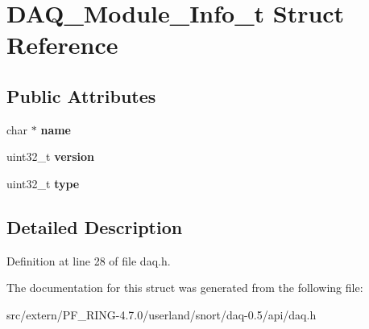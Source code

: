 \hypertarget{struct_d_a_q___module___info__t}{
\section{DAQ\_\-Module\_\-Info\_\-t Struct Reference}
\label{struct_d_a_q___module___info__t}
}
\subsection*{Public Attributes}
\begin{DoxyCompactItemize}
\item 
\hypertarget{struct_d_a_q___module___info__t_ad6b68b30f3673f8721b6b3a95b452eba}{
char $\ast$ {\bfseries name}}
\label{struct_d_a_q___module___info__t_ad6b68b30f3673f8721b6b3a95b452eba}

\item 
\hypertarget{struct_d_a_q___module___info__t_a2e31ed2b31402507de7e6ca8e21eac14}{
uint32\_\-t {\bfseries version}}
\label{struct_d_a_q___module___info__t_a2e31ed2b31402507de7e6ca8e21eac14}

\item 
\hypertarget{struct_d_a_q___module___info__t_a524554afb1a9babad0d50deae9026a45}{
uint32\_\-t {\bfseries type}}
\label{struct_d_a_q___module___info__t_a524554afb1a9babad0d50deae9026a45}

\end{DoxyCompactItemize}


\subsection{Detailed Description}


Definition at line 28 of file daq.h.



The documentation for this struct was generated from the following file:\begin{DoxyCompactItemize}
\item 
src/extern/PF\_\-RING-\/4.7.0/userland/snort/daq-\/0.5/api/daq.h\end{DoxyCompactItemize}
